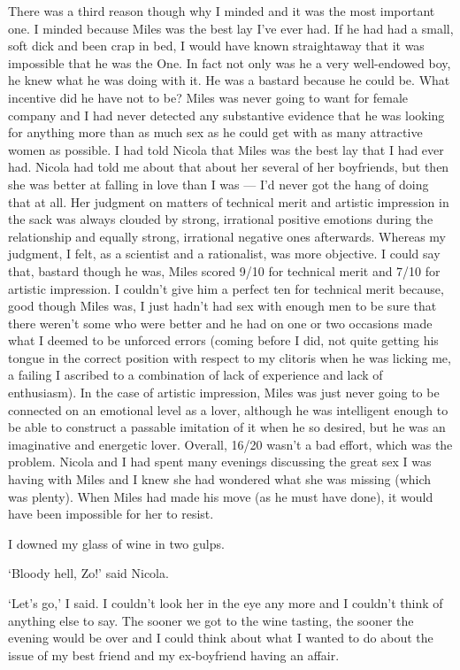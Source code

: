 There was a third reason though why I minded and it was the most important one. I minded
because Miles was the best lay I've ever had. If he
had had a small, soft dick and been crap in bed, I would have known straightaway that it was impossible that he was the One. In fact not only
was he a very well-endowed boy, he {\twelveit knew\/} what he was doing
with it. He was a bastard because he could be. What incentive did he have not to be? Miles was never going to want for female company and I had never detected any substantive evidence that he was looking for anything more than as much
sex as he could get with as many attractive women as possible. I had
told Nicola that Miles was the best lay that I had ever had. Nicola
had told me about that about her several of her boyfriends, but then
she was better at falling in love than I was --- I'd never got the hang
of doing that at all. Her judgment on matters of technical merit and artistic
impression in the sack was always clouded by strong, irrational
positive emotions during the relationship and equally strong, irrational negative ones afterwards. Whereas my judgment, I felt, as a scientist and a rationalist, was
more objective. I could say that, bastard though he was, Miles
scored 9/10 for technical merit and 7/10 for artistic impression. I
couldn't give him a perfect ten for technical merit because, good though
Miles was, I just hadn't had sex with enough men to be sure that there
weren't some who were better and he had on one or two occasions made what
I deemed to be unforced errors (coming before I did, not quite getting his tongue in the correct position with respect to my clitoris when he was licking me, a failing I ascribed to a combination of lack of experience and lack of enthusiasm). In the case of artistic impression, Miles was just never going
to be connected on an emotional level as a lover, although he was intelligent enough to be able to construct
a passable imitation of it when he so desired, but he was an imaginative and energetic lover. Overall, 16/20 wasn't a bad effort, which was
the problem. Nicola and I had spent many evenings discussing the great sex I was having with Miles and I knew she had wondered what she was missing (which was plenty). When Miles had
made his move (as he must have done), it would have been impossible for her to resist.

I downed my glass of wine in two gulps.

`Bloody hell, Zo!' said Nicola.

`Let's go,' I said. I couldn't look her in the eye any more and I couldn't think of anything else to say. The sooner we got to the wine tasting, the sooner the evening would be over and I could think about what I wanted to do about the issue of my best friend and my ex-boyfriend having an affair.

